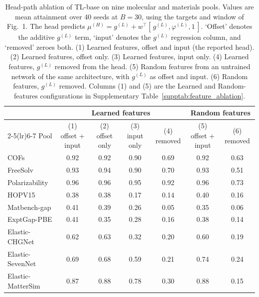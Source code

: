 \begin{table}[p]
\centering
\scriptsize
\caption{Head-path ablation of TL-base on nine molecular and materials pools. Values are mean attainment over 40 seeds at $B = 30$, using the targets and window of Fig.~1. The head predicts $\mu^{(H)} = g^{(L)} + w^{\top}[\,g^{(L)}, \varphi^{(L)}, 1\,]$. `Offset' denotes the additive $g^{(L)}$ term, `input' denotes the $g^{(L)}$ regression column, and `removed' zeroes both. (1) Learned features, offset and input (the reported head). (2) Learned features, offset only. (3) Learned features, input only. (4) Learned features, $g^{(L)}$ removed from the head. (5) Random features from an untrained network of the same architecture, with $g^{(L)}$ as offset and input. (6) Random features, $g^{(L)}$ removed. Columns (1) and (5) are the Learned and Random-features configurations in Supplementary Table~\ref{supptab:feature_ablation}.}
\label{supptab:head_path}
\setlength{\tabcolsep}{3pt}%
\begin{tabular}{@{}lcccccc@{}}
\toprule
 & \multicolumn{4}{c}{Learned features} & \multicolumn{2}{c}{Random features} \\
\cmidrule(lr){2-5}\cmidrule(lr){6-7}
Pool & (1) offset + input & (2) offset only & (3) input only & (4) removed & (5) offset + input & (6) removed \\
\midrule
COFs & 0.92 & 0.92 & 0.90 & 0.69 & 0.92 & 0.63 \\
FreeSolv & 0.93 & 0.94 & 0.90 & 0.70 & 0.93 & 0.51 \\
Polarizability & 0.96 & 0.96 & 0.95 & 0.92 & 0.96 & 0.73 \\
HOPV15 & 0.38 & 0.38 & 0.17 & 0.14 & 0.40 & 0.16 \\
Matbench-gap & 0.41 & 0.39 & 0.26 & 0.05 & 0.35 & 0.06 \\
ExptGap-PBE & 0.41 & 0.35 & 0.28 & 0.16 & 0.38 & 0.14 \\
Elastic-CHGNet & 0.62 & 0.63 & 0.32 & 0.20 & 0.60 & 0.19 \\
Elastic-SevenNet & 0.69 & 0.68 & 0.59 & 0.21 & 0.74 & 0.24 \\
Elastic-MatterSim & 0.87 & 0.88 & 0.78 & 0.30 & 0.88 & 0.15 \\
\bottomrule
\end{tabular}
\end{table}

